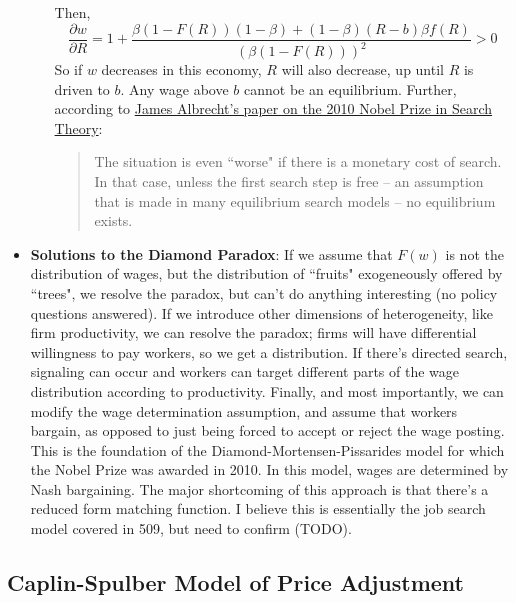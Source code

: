 \documentclass[12pt]{article}
\begin{document}
\begin{itemize}
\begin{enumerate}
        Then, 
        \[\frac{\partial w}{\partial R} = 1+\frac{\beta(1-F(R))(1-\beta) + (1-\beta)(R-b)\beta f(R)}{\left(\beta(1-F(R))\right)^2} > 0\]
        So if $w$ decreases in this economy, $R$ will also decrease, up until $R$ is driven to $b$. Any wage above $b$ cannot be an equilibrium. Further, according to \href{https://faculty.georgetown.edu/albrecht/SJE\%20Survey.pdf}{James Albrecht's paper on the 2010 Nobel Prize in Search Theory}:
        \begin{quote}
            The situation is even ``worse" if there is a monetary cost of search. In that case, unless the first search step is free -- an assumption that is made in many equilibrium search models -- no equilibrium exists.
        \end{quote}
    \end{enumerate}
    \item \textbf{Solutions to the Diamond Paradox}: If we assume that $F(w)$ is not the distribution of wages, but the distribution of ``fruits" exogeneously offered by ``trees", we resolve the paradox, but can't do anything interesting (no policy questions answered). If we introduce other dimensions of heterogeneity, like firm productivity, we can resolve the paradox; firms will have differential willingness to pay workers, so we get a distribution. If there's directed search, signaling can occur and workers can target different parts of the wage distribution according to productivity. Finally, and most importantly, we can modify the wage determination assumption, and assume that workers bargain, as opposed to just being forced to accept or reject the wage posting. This is the foundation of the Diamond-Mortensen-Pissarides model for which the Nobel Prize was awarded in 2010. In this model, wages are determined by Nash bargaining. The major shortcoming of this approach is that there's a reduced form matching function. I believe this is essentially the job search model covered in 509, but need to confirm (TODO). 
\end{itemize}

\subsection{Caplin-Spulber Model of Price Adjustment}
\end{document}

